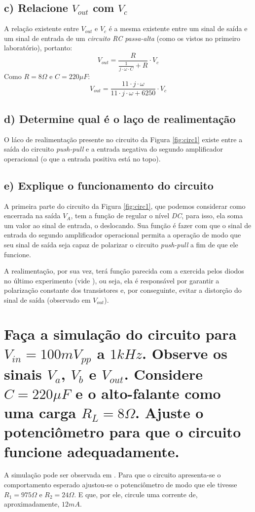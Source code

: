 \documentclass{article}
\begin{document}
         \subsection{c) Relacione $V_{out}$ com $V_c$}
            A relação existente entre $V_{out}$ e $V_c$ é a mesma existente entre um sinal de saída e um sinal de entrada de um \emph{circuito RC passa-alta} (como os vistos no primeiro laboratório), portanto:
            \begin{equation*}
                V_{out} = \frac{R}{\frac{1}{j\cdot\omega\cdot C} + R} \cdot V_c
            \end{equation*}
            Como $R = 8\Omega$ e $C = 220 \mu F$:
                \begin{equation*}
                    V_{out} = \frac{11 \cdot j \cdot \omega}{11 \cdot j \cdot \omega + 6250} \cdot V_{c}
                \end{equation*}
            
         \subsection{d) Determine qual é o laço de realimentação}
            O láco de realimentação presente no circuito da Figura \ref{fig:circ1} existe entre a saída do circuito \emph{push-pull} e a entrada negativa do segundo amplificador operacional (o que a entrada positiva está no topo).
            
         \subsection{e) Explique o funcionamento do circuito}
            A primeira parte do circuito da Figura \ref{fig:circ1}, que podemos considerar como encerrada na saída $V_A$, tem a função de regular o nível \emph{DC}, para isso, ela soma um valor ao sinal de entrada, o deslocando. Sua função é fazer com que o sinal de entrada do segundo amplificador operacional permita a operação de modo que seu sinal de saída seja capaz de polarizar o circuito \emph{push-pull} a fim de que ele funcione. 
            
            A realimentação, por sua vez, terá função parecida com a exercida pelos diodos no último experimento (vide \cite{}), ou seja, ela é responsável por garantir a polarização constante dos transistores e, por conseguinte, evitar a distorção do sinal de saída (observado em $V_{out}$).
           
    \section{Faça a simulação do circuito para $V_{in} = 100mV_{pp}$ a $1kHz$. Observe os sinais $V_a$, $V_b$ e $V_{out}$. Considere $C = 220\mu F$ e o alto-falante como uma carga $R_L = 8\Omega$. Ajuste o potenciômetro para que o circuito funcione adequadamente. }   
        A simulação pode ser observada em \cite{ref:simu}. Para que o circuito apresenta-se o comportamento esperado ajustou-se o potenciômetro de modo que ele tivesse $R_1 = 975\Omega$ e $R_2 = 24\Omega$. E que, por ele, circule uma corrente de, aproximadamente, $12 mA$.
            
\end{document}
